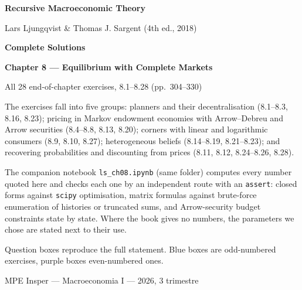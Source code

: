 \documentclass[12pt, letterpaper]{article}
\begin{document}
\begin{titlepage}
\centering
\vspace*{2.5cm}
{\Huge\bfseries\color{darkblue} Recursive Macroeconomic Theory\par}
\vspace{6pt}
{\large Lars Ljungqvist \& Thomas J. Sargent (4th ed., 2018)\par}
\vspace{1.4cm}
{\LARGE\bfseries Complete Solutions\par}
\vspace{6pt}
{\LARGE\bfseries Chapter 8 --- Equilibrium with Complete Markets\par}
\vspace{1.2cm}
{\large All 28 end-of-chapter exercises, 8.1--8.28 (pp.~304--330)\par}
\vspace{2cm}

\begin{tcolorbox}[theorybox,title={What is in this file},width=0.86\textwidth]
\small
The exercises fall into five groups: planners and their decentralisation (8.1--8.3, 8.16, 8.23);
pricing in Markov endowment economies with Arrow--Debreu and Arrow securities (8.4--8.8, 8.13, 8.20);
corners with linear and logarithmic consumers (8.9, 8.10, 8.27); heterogeneous beliefs (8.14--8.19,
8.21--8.23); and recovering probabilities and discounting from prices (8.11, 8.12, 8.24--8.26, 8.28).

\smallskip
The companion notebook \texttt{ls\_ch08.ipynb} (same folder) computes every number quoted here and
checks each one by an independent route with an \texttt{assert}: closed forms against \texttt{scipy}
optimisation, matrix formulas against brute-force enumeration of histories or truncated sums, and
Arrow-security budget constraints state by state. Where the book gives no numbers, the parameters we
chose are stated next to their use.

\smallskip
Question boxes reproduce the full statement. Blue boxes are odd-numbered exercises, purple boxes
even-numbered ones.
\end{tcolorbox}

\vfill
{\small MPE Insper --- Macroeconomia I --- 2026, 3\textordmasculine{} trimestre\par}
\end{titlepage}
\end{document}
